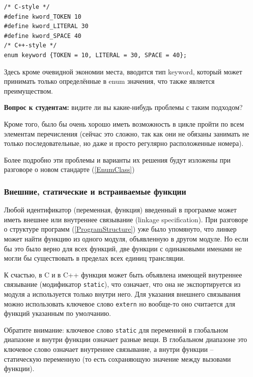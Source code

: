 \documentclass[a4paper,12pt,oneside]{article}
\newif\ifanswers
\begin{document}
\begin{lstlisting}
/* C-style */
#define kword_TOKEN 10
#define kword_LITERAL 30
#define kword_SPACE 40
/* C++-style */
enum keyword {TOKEN = 10, LITERAL = 30, SPACE = 40};
\end{lstlisting}

Здесь кроме очевидной экономии места, вводится тип keyword, который может принимать только определённые в enum значения, что также является преимуществом.

\textbf{Вопрос к студентам:} видите ли вы какие-нибудь проблемы с таким подходом?

\ifanswers
Возможный ответ: да, символьное имя \lstinline!TOKEN! может конфликтовать с другим перечислением.
\fi

Кроме того, было бы очень хорошо иметь возможность в цикле пройти по всем элементам перечисления (сейчас это сложно, так как они не обязаны занимать не только последовательные, но даже и просто регулярно расположенные номера).

Более подробно эти проблемы и варианты их решения будут изложены при разговоре о новом стандарте (\ref{EnumClass})

\subsubsection{Внешние, статические и встраиваемые функции}\label{Inline}

Любой идентификатор (переменная, функция) введенный в программе может иметь внешнее или внутреннее связывание (linkage specification). При разговоре о структуре программ (\ref{ProgramStructure}) уже было упомянуто, что линкер может найти функцию из одного модуля, объявленную в другом модуле. Но если бы это было верно для всех функций, две функции с одинаковыми именами не могли бы существовать в пределах всех единиц трансляции. 

К счастью, в C и в C++ функция может быть объявлена имеющей внутреннее связывание (модификатор \lstinline!static!), что означает, что она не экспортируется из модуля а используется только внутри него. Для указания внешнего связывания можно использовать ключевое слово \lstinline!extern! но вообще-то оно считается для функций указанным по умолчанию.

Обратите внимание: ключевое слово \lstinline!static! для переменной в глобальном диапазоне и внутри функции означает разные вещи. В глобальном диапазоне это ключевое слово означает внутреннее связывание, а внутри функции -- статическую переменную (то есть сохраняющую значение между вызовами функции).
\end{document}
